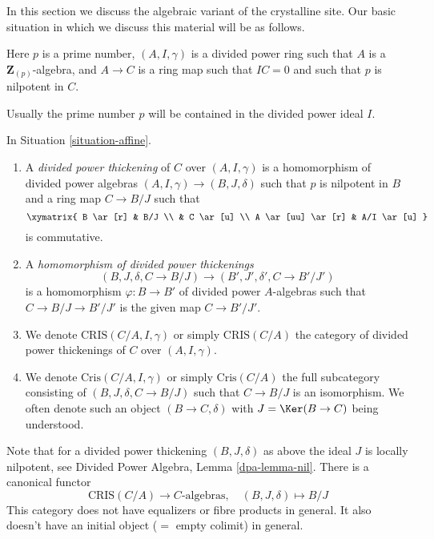 \noindent
In this section we discuss the algebraic variant of the crystalline site.
Our basic situation in which we discuss this material will be as
follows.

\begin{situation}
\label{situation-affine}
Here $p$ is a prime number, $(A, I, \gamma)$ is a divided power
ring such that $A$ is a $\mathbf{Z}_{(p)}$-algebra, and $A \to C$ is a
ring map such that $IC = 0$ and such that $p$ is nilpotent in $C$.
\end{situation}

\noindent
Usually the prime number $p$ will be contained in the
divided power ideal $I$.

\begin{definition}
\label{definition-affine-thickening}
In Situation \ref{situation-affine}.
\begin{enumerate}
\item A {\it divided power thickening} of $C$ over $(A, I, \gamma)$
is a homomorphism of divided power algebras $(A, I, \gamma) \to (B, J, \delta)$
such that $p$ is nilpotent in $B$ and a ring map $C \to B/J$ such that
$$
\xymatrix{
B \ar[r] & B/J \\
& C \ar[u] \\
A \ar[uu] \ar[r] & A/I \ar[u]
}
$$
is commutative.
\item A {\it homomorphism of divided power thickenings}
$$
(B, J, \delta, C \to B/J) \longrightarrow (B', J', \delta', C \to B'/J')
$$
is a homomorphism $\varphi : B \to B'$ of divided power $A$-algebras such
that $C \to B/J \to B'/J'$ is the given map $C \to B'/J'$.
\item We denote $\text{CRIS}(C/A, I, \gamma)$ or simply $\text{CRIS}(C/A)$
the category of divided power thickenings of $C$ over $(A, I, \gamma)$.
\item We denote $\text{Cris}(C/A, I, \gamma)$ or simply $\text{Cris}(C/A)$
the full subcategory consisting of $(B, J, \delta, C \to B/J)$ such that
$C \to B/J$ is an isomorphism. We often denote such an object
$(B \to C, \delta)$ with $J = \Ker(B \to C)$ being understood.
\end{enumerate}
\end{definition}

\noindent
Note that for a divided power thickening $(B, J, \delta)$ as above
the ideal $J$ is locally nilpotent, see
Divided Power Algebra, Lemma \ref{dpa-lemma-nil}.
There is a canonical functor
\begin{equation}
\label{equation-forget-affine}
\text{CRIS}(C/A) \longrightarrow C\text{-algebras},\quad
(B, J, \delta) \longmapsto B/J
\end{equation}
This category does not have equalizers or fibre products in general.
It also doesn't have an initial object ($=$ empty colimit) in general.

